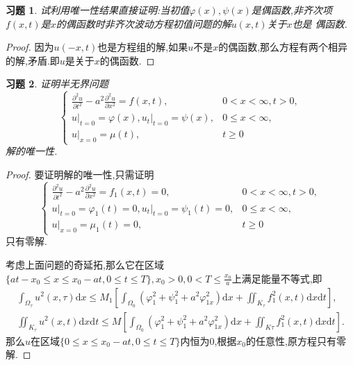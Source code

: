 \documentclass[a4paper,oneside,12pt]{ctexart}
\theoremstyle{plain}
\newtheorem{exercise}{习题}
\theoremstyle{nonumberplain}
\theoremstyle{nonumberplain}
\newtheorem{proof}{证明.}
\newcommand{\dif}{\mathrm{d}}
\newcommand{\ptl}{\partial}
\renewcommand{\phi}{\varphi}
\newcommand{\cond}[2]{\left. #1\right|_{#2}}
\begin{document}
    \begin{exercise}
        \label{ex:10}
        试利用唯一性结果直接证明:当初值$\phi(x),\psi(x)$是偶函数,非齐次项$f(x,t)$是$x$的偶函数时非齐次波动方程初值问题的解$u(x,t)$关于$x$也是
        偶函数.
    \end{exercise}

    \begin{proof}
        因为$u(-x,t)$也是方程组的解,如果$u$不是$x$的偶函数,那么方程有两个相异的解,矛盾.即$u$是关于$x$的偶函数.
    \end{proof}

    \begin{exercise}
        \label{ex:12}
        证明半无界问题 
        \begin{equation*}
            \begin{cases}
                \frac{\ptl^2 u}{\ptl t^2}-a^2\frac{\ptl^2 u}{\ptl x^2}=f(x,t),&0<x<\infty,t>0,\\
                \cond{u}{t=0}=\phi(x),\cond{u_t}{t=0}=\psi(x),& 0\leqslant x<\infty,\\
                \cond{u}{x=0}=\mu(t),& t\geqslant 0
            \end{cases}
        \end{equation*}
        解的唯一性.
    \end{exercise}

    \begin{proof}
        要证明解的唯一性,只需证明
        \begin{equation*}
            \begin{cases}
                \frac{\ptl^2 u}{\ptl t^2}-a^2\frac{\ptl^2 u}{\ptl x^2}=f_1(x,t)=0,&0<x<\infty,t>0,\\
                \cond{u}{t=0}=\phi_1(t)=0,\cond{u_t}{t=0}=\psi_1(t)=0,& 0\leqslant x<\infty,\\
                \cond{u}{x=0}=\mu_1(t)=0,& t\geqslant 0
            \end{cases}
        \end{equation*}
        只有零解.

        考虑上面问题的奇延拓,那么它在区域$\{at-x_0\leqslant x\leqslant x_0-at,0\leqslant t\leqslant T\},x_0>0,0<T\leqslant\frac{x_0}{a}$上满足能量不等式,即
        \begin{gather*}
            \int_{\Omega_\tau}u^2(x,\tau)\dif x\leqslant M_1\left[\int_{\Omega_0}(\phi_1^2+\psi_1^2+a^2\phi_{1x}^2)\dif x+\iint_{K_\tau}f_1^2(x,t)\dif x\dif t\right],\\
            \iint_{K_\tau}u^2(x,t)\dif x\dif t\leqslant M\left[\int_{\Omega_0}(\phi_1^2+\psi_1^2+a^2\phi_{1x}^2)\dif x+\iint_{K\tau}f_1^2(x,t)\dif x\dif t\right].
        \end{gather*}
        那么$u$在区域$\{0\leqslant x\leqslant x_0-at,0\leqslant t\leqslant T\}$内恒为0,根据$x_0$的任意性,原方程只有零解.
    \end{proof}
    
\end{document}

